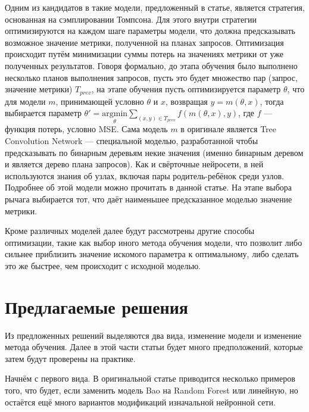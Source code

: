 \documentclass[12pt]{article}
\begin{document}
Одним из кандидатов в такие модели, предложенный в статье, является стратегия, основанная на сэмплировании Томпсона. Для этого внутри стратегии оптимизируются на каждом шаге параметры модели, что должна предсказывать возможное значение метрики, полученной на планах запросов. Оптимизация происходит путём минимизации суммы потерь на значениях метрики от уже полученных результатов. Говоря формально, до этапа обучения было выполнено несколько планов выполнения запросов, пусть это будет множество пар (запрос, значение метрики) $T_{prev}$, на этапе обучения пусть оптимизируется параметр $\theta$, что для модели $m$, принимающей условно $\theta$ и $x$, возвращая $y = m(\theta, x)$, тогда выбирается параметр $\theta' = \underset{\theta}{\mathrm{argmin}} \sum_{(x, y) \in T_{prev}} f(m(\theta, x), y)$, где $f$ — функция потерь, условно MSE. Сама модель $m$ в оригинале является Tree Convolution Network — специальной моделью, разработанной чтобы предсказывать по бинарным деревьям некие значения (именно бинарным деревом и является дерево плана запросов). Как и свёрточные нейросети, в ней используются знания об узлах, включая пары родитель-ребёнок среди узлов. Подробнее об этой модели можно прочитать в данной статье\cite{tcnn}. На этапе выбора рычага выбирается тот, что даёт наименьшее предсказанное моделью значение метрики.

Кроме различных моделей далее будут рассмотрены другие способы оптимизации, такие как выбор иного метода обучения модели, что позволит либо сильнее приблизить значение искомого параметра к оптимальному, либо сделать это же быстрее, чем происходит с исходной моделью.

\section{Предлагаемые решения}

Из предложенных решений выделяются два вида, изменение модели и изменение метода обучения. Далее в этой части статьи будет много предположений, которые затем будут проверены на практике.

Начнём с первого вида. В оригинальной статье\cite{bao} приводится несколько примеров того, что будет, если заменить модель Bao на Random Forest или линейную, но остаётся ещё много вариантов модификаций изначальной нейронной сети.
\end{document}
